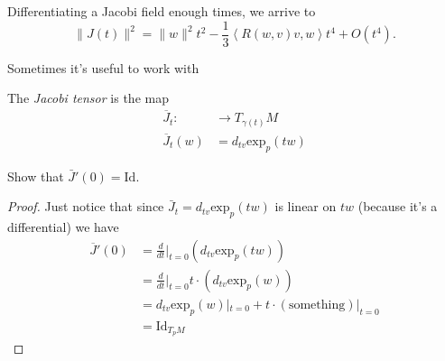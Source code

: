 \documentclass{book}
\begin{document}
\begin{proposition}
\label{proposition-jacob-field-taylo-expan}
Differentiating a Jacobi field enough times,
we arrive to
\begin{equation}
\label{equation-jacob-field-taylo-expan}
\|J(t)\|^2=\|w\|^2t^2-\frac{1}{3}\left\langle{}R(w,v)
v,w\right\rangle{}t^4+O(t^4).
\end{equation}
\end{proposition}

Sometimes it's useful to work with

\begin{definition}
\label{definition-Jacobi-tensor}
The {\it Jacobi tensor} is the map
$$
\begin{aligned}
	\overline{J}_t:  &\longrightarrow
	T_{\gamma(t)}M \\
	 \overline{J}_t(w)&=d_{tv}\text{exp}_p(tw)
\end{aligned}
$$
\end{definition}

\begin{exercise}
\label{exercise-Jacobi-tensor-derivative}
Show that $\bar{J}'(0)=\text{Id}$.
\end{exercise}

\begin{proof}
Just notice that since
$\bar{J}_t=d_{tv}\text{exp}_p(tw)$ is linear
on
$tw$ (because it's a differential) we have
$$
\begin{aligned}
\overline{J}'(0)&=\frac{d}{dt}\Big|_{t=0}
(d_{tv}\text{exp}_p(tw))\\
&=\frac{d}{dt}\Big|_{t=0}t\cdot
(d_{tv}\text{exp}_p(w))\\
&=d_{tv}\text{exp}_p(w)|_{t=0}+
t\cdot(\text{something})|_{t=0}\\
&=\text{Id}_{T_pM}
\end{aligned}
$$
\end{proof}
\end{document}
